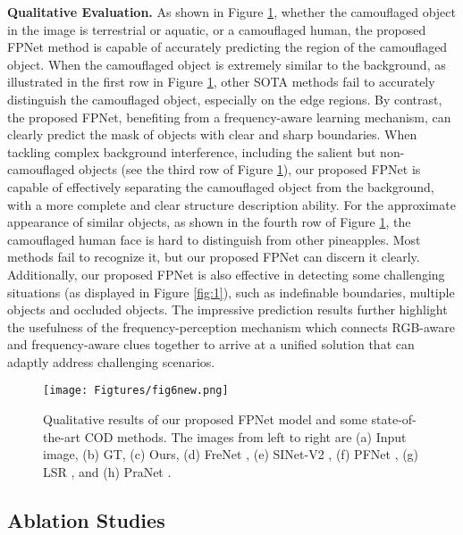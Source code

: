 \documentclass[sigconf,screen]{acmart}
\begin{document}
\noindent \textbf{Qualitative Evaluation. }
As shown in Figure \ref{fig:6}, whether the camouflaged object in the image is terrestrial or aquatic, or a camouflaged human, the proposed FPNet method is capable of accurately predicting the region of the camouflaged object. 
When the camouflaged object is extremely similar to the background, as illustrated in the first row in Figure \ref{fig:6}, other SOTA methods fail to accurately distinguish the camouflaged object, especially on the edge regions. By contrast, the proposed FPNet, benefiting from a frequency-aware learning mechanism, can clearly predict the mask of objects with clear and sharp boundaries.
When tackling complex background interference, including the salient but non-camouflaged objects (see the third row of Figure \ref{fig:6}), our proposed FPNet is capable of effectively separating the camouflaged object from the background, with a more complete and clear structure description ability.
For the approximate appearance of similar objects, as shown in the fourth row of Figure \ref{fig:6}, the camouflaged human face is hard to distinguish from other pineapples. Most methods fail to recognize it, but our proposed FPNet can discern it clearly. 
Additionally, our proposed FPNet is also effective in detecting some challenging situations (as displayed in Figure \ref{fig:1}), such as indefinable boundaries, multiple objects and occluded objects. The impressive prediction results further highlight the usefulness of the frequency-perception mechanism which connects RGB-aware and frequency-aware clues together to arrive at a unified solution that can adaptly address challenging scenarios.



\begin{figure}[!t]
\centering
\texttt{[image: Figtures/fig6new.png]}
\caption{Qualitative results of our proposed FPNet model and some state-of-the-art COD methods. The images from left to right are (a) Input image, (b) GT, (c) Ours, (d) FreNet \cite{r39}, (e) SINet-V2 \cite{r53}, (f) PFNet \cite{r15}, (g) LSR \cite{r38}, and (h) PraNet \cite{r24}.}
\label{fig:6}
\end{figure}

\subsection {Ablation Studies}
\end{document}
